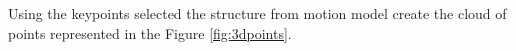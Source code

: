 \documentclass[12pt,a4paper]{article}
\begin{document}
Using the keypoints selected the structure from motion model create the cloud of points represented in  the Figure \ref{fig:3dpoints}.

\begin{figure}[!h]
	\centering
	\enskip
	\enskip

\end{figure}
\end{document}
